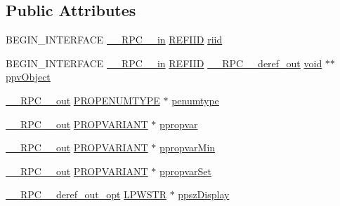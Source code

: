 \subsection*{Public Attributes}
\begin{DoxyCompactItemize}
\item 
B\+E\+G\+I\+N\+\_\+\+I\+N\+T\+E\+R\+F\+A\+CE \hyperlink{rpcsal_8h_a20b7f6da600a05c8b541659f14f7f0e6}{\+\_\+\+\_\+\+R\+P\+C\+\_\+\+\_\+in} \hyperlink{px__win__ds_8c_a80ec49c8ae61e234197d5071d2df497d}{R\+E\+F\+I\+ID} \hyperlink{struct_i_property_enum_type_vtbl_a0036b34595dd32ce7dd0726d302cb6dc}{riid}
\item 
B\+E\+G\+I\+N\+\_\+\+I\+N\+T\+E\+R\+F\+A\+CE \hyperlink{rpcsal_8h_a20b7f6da600a05c8b541659f14f7f0e6}{\+\_\+\+\_\+\+R\+P\+C\+\_\+\+\_\+in} \hyperlink{px__win__ds_8c_a80ec49c8ae61e234197d5071d2df497d}{R\+E\+F\+I\+ID} \hyperlink{rpcsal_8h_a23bc188526f10656f9c79d950f6c3192}{\+\_\+\+\_\+\+R\+P\+C\+\_\+\+\_\+deref\+\_\+out} \hyperlink{sound_8c_ae35f5844602719cf66324f4de2a658b3}{void} $\ast$$\ast$ \hyperlink{struct_i_property_enum_type_vtbl_ad48b0f69d4b782eca21373bda4a69626}{ppv\+Object}
\item 
\hyperlink{rpcsal_8h_aa518a2c78d44d75f3685c32c455c5ed8}{\+\_\+\+\_\+\+R\+P\+C\+\_\+\+\_\+out} \hyperlink{propsys_8h_a6c2f73a0f1c4948046db89540dac324e}{P\+R\+O\+P\+E\+N\+U\+M\+T\+Y\+PE} $\ast$ \hyperlink{struct_i_property_enum_type_vtbl_aa384d319cc3cd7e86ea94f577729d372}{penumtype}
\item 
\hyperlink{rpcsal_8h_aa518a2c78d44d75f3685c32c455c5ed8}{\+\_\+\+\_\+\+R\+P\+C\+\_\+\+\_\+out} \hyperlink{propidl_8h_ae902c1757cd16052896846fa4ebb88d8}{P\+R\+O\+P\+V\+A\+R\+I\+A\+NT} $\ast$ \hyperlink{struct_i_property_enum_type_vtbl_acb672c8ea9c6ca5e144c88a235ea2e0a}{ppropvar}
\item 
\hyperlink{rpcsal_8h_aa518a2c78d44d75f3685c32c455c5ed8}{\+\_\+\+\_\+\+R\+P\+C\+\_\+\+\_\+out} \hyperlink{propidl_8h_ae902c1757cd16052896846fa4ebb88d8}{P\+R\+O\+P\+V\+A\+R\+I\+A\+NT} $\ast$ \hyperlink{struct_i_property_enum_type_vtbl_aa466b252bb93f229a693ec30fa42f89c}{ppropvar\+Min}
\item 
\hyperlink{rpcsal_8h_aa518a2c78d44d75f3685c32c455c5ed8}{\+\_\+\+\_\+\+R\+P\+C\+\_\+\+\_\+out} \hyperlink{propidl_8h_ae902c1757cd16052896846fa4ebb88d8}{P\+R\+O\+P\+V\+A\+R\+I\+A\+NT} $\ast$ \hyperlink{struct_i_property_enum_type_vtbl_afae84f821057d2ae04ad25407cb0304b}{ppropvar\+Set}
\item 
\hyperlink{rpcsal_8h_ab29e89ceb0eb0b075c6f6299b0de6a21}{\+\_\+\+\_\+\+R\+P\+C\+\_\+\+\_\+deref\+\_\+out\+\_\+opt} \hyperlink{mapinls_8h_acc28f72b93422cfd63a60e5a102a77b1}{L\+P\+W\+S\+TR} $\ast$ \hyperlink{struct_i_property_enum_type_vtbl_a519a7aa86bc34b57680a90b61429b9d4}{ppsz\+Display}
\end{DoxyCompactItemize}


